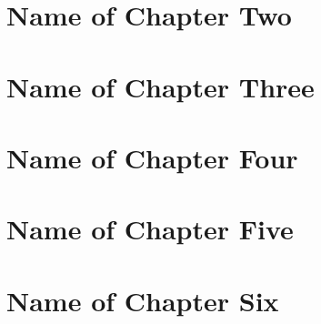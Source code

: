 \documentclass[12pt,psfig]{report}
\begin{document}
\chapter{Name of Chapter Two}\label{chap2}
\thispagestyle{myheadings}

 
\chapter{Name of Chapter Three}\label{chap3}
\thispagestyle{myheadings}

 
\chapter{Name of Chapter Four}\label{chap4}
\thispagestyle{myheadings}

 
\chapter{Name of Chapter Five}\label{chap5}
\thispagestyle{myheadings}

 
\chapter{Name of Chapter Six}\label{chap6}
\thispagestyle{myheadings}

 

 
\end{document}
